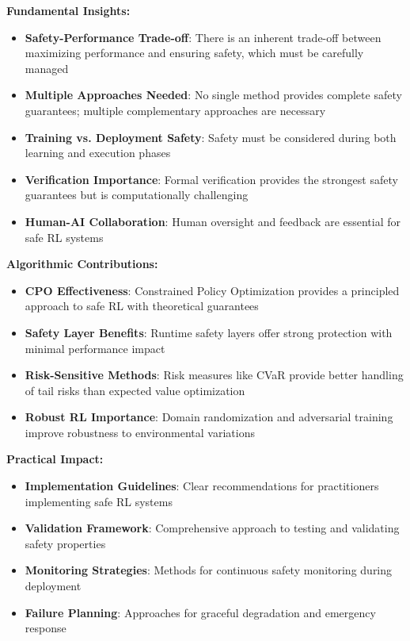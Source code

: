 \documentclass[12pt]{article}
\begin{document}
{{{{\textbf{Fundamental Insights:}
\begin{itemize}
\item \textbf{Safety-Performance Trade-off}: There is an inherent trade-off between maximizing performance and ensuring safety, which must be carefully managed
\item \textbf{Multiple Approaches Needed}: No single method provides complete safety guarantees; multiple complementary approaches are necessary
\item \textbf{Training vs. Deployment Safety}: Safety must be considered during both learning and execution phases
\item \textbf{Verification Importance}: Formal verification provides the strongest safety guarantees but is computationally challenging
\item \textbf{Human-AI Collaboration}: Human oversight and feedback are essential for safe RL systems
\end{itemize}

\textbf{Algorithmic Contributions:}
\begin{itemize}
\item \textbf{CPO Effectiveness}: Constrained Policy Optimization provides a principled approach to safe RL with theoretical guarantees
\item \textbf{Safety Layer Benefits}: Runtime safety layers offer strong protection with minimal performance impact
\item \textbf{Risk-Sensitive Methods}: Risk measures like CVaR provide better handling of tail risks than expected value optimization
\item \textbf{Robust RL Importance}: Domain randomization and adversarial training improve robustness to environmental variations
\end{itemize}

\textbf{Practical Impact:}
\begin{itemize}
\item \textbf{Implementation Guidelines}: Clear recommendations for practitioners implementing safe RL systems
\item \textbf{Validation Framework}: Comprehensive approach to testing and validating safety properties
\item \textbf{Monitoring Strategies}: Methods for continuous safety monitoring during deployment
\item \textbf{Failure Planning}: Approaches for graceful degradation and emergency response
\end{itemize}

}}}}
\end{document}
